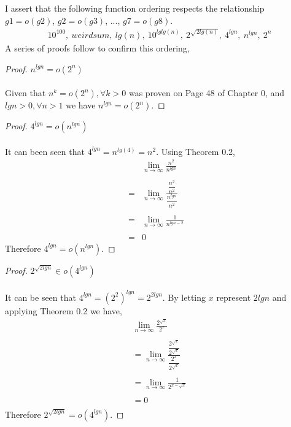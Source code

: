\documentclass[12pt]{article}
\newenvironment{question}[2][Question]{\begin{trivlist}
\item[\hskip \labelsep {\bfseries #1}\hskip \labelsep {\bfseries #2.}]}{\end{trivlist}}
\begin{document}
\begin{question}{4}
  I assert that the following function ordering respects the relationship
  $g1 = o(g2)$, $g2 = o(g3)$, ..., $g7 = o(g8)$.
  \begin{align*}
    10^{100},\ weirdsum,\ lg(n),\ 10^{lglg(n)},\ 2^{\sqrt{2lg(n)}},\ 4^{lgn},\ n^{lgn},\ 2^{n}
  \end{align*}
  A series of proofs follow to confirm this ordering,

  \begin{proof} $n^{lgn} = o(2^{n})$
    \leavevmode \\ \\
    Given that $n^{k} = o(2^{n}), \forall k > 0$ was proven on Page 48 of Chapter 0,
    and $lgn > 0, \forall n > 1$ we have $n^{lgn} = o(2^{n})$.
  \end{proof}

  \begin{proof} $4^{lgn} = o(n^{lgn})$
    \leavevmode \\ \\
    It can been seen that $4^{lgn} = n^{lg(4)} = n^{2}$.  Using Theorem 0.2,
    \begin{align*}
      &\lim_{n\to\infty} \frac{
        n^{2}
      }{
        n^{lgn}
      }&\\ \\
      = &\lim_{n\to\infty} \frac{
        \dfrac{n^{2}}{n^{2}}
      }{
        \dfrac{n^{lgn}}{n^{2}}
      }&\\ \\
      = & \lim_{n\to\infty} \frac{
        1
      }{n^{lgn - 2}}\\ \\
      = & 0
    \end{align*}
    Therefore $4^{lgn} = o(n^{lgn})$.
  \end{proof}

  \begin{proof} $2^{\sqrt{2lgn}} \in o(4^{lgn})$
    \leavevmode \\ \\
    It can be seen that $4^{lgn} = (2^{2})^{lgn} = 2^{2lgn}$.
    By letting $x$ represent $2lgn$ and applying Theorem 0.2 we have,
    \begin{align*}
      &\lim_{n\to\infty} \frac{
        2^{\sqrt{x}}
      }{
        2^{x}
      }&\\ \\
      & = \lim_{n\to\infty} \frac{
        \dfrac{
          2^{\sqrt{x}}
        }{
          2^{\sqrt{x}}
        }
      }{
        \dfrac{
          2^{x}
        }{
          2^{\sqrt{x}}
        }
      }&\\ \\
      & = \lim_{n\to\infty} \frac{1}{
        2^{x - \sqrt{x}}
      }&\\ \\
      & = 0&\\
    \end{align*}
    Therefore $2^{\sqrt{2lgn}} = o(4^{lgn})$.
  \end{proof}


\end{question}
\end{document}
